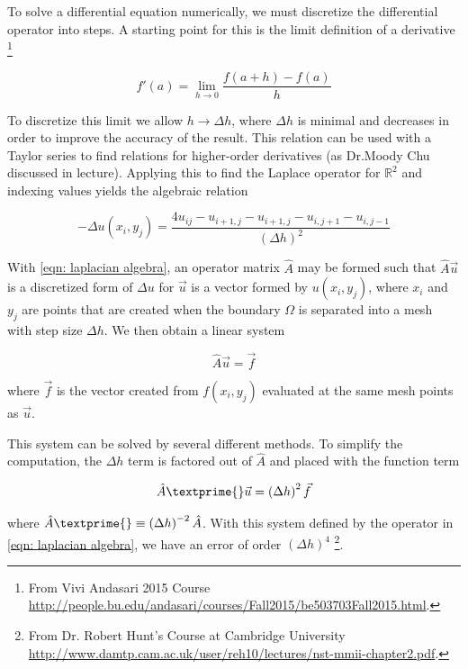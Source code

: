 \documentclass[10pt,a4paper]{article}
\begin{document}
To solve a differential equation numerically, we must discretize the differential operator into steps. A starting point for this is the limit definition of a derivative \footnote{From Vivi Andasari 2015 Course \url{http://people.bu.edu/andasari/courses/Fall2015/be503703Fall2015.html}.}

\begin{equation}
\label{eqn: limit derivative}
f'(a) = \lim\limits_{h \to 0} \frac{f(a + h) - f(a)}{h}
\end{equation}

To discretize this limit we allow $h \to \Delta h$, where $\Delta h$ is minimal and decreases in order to improve the accuracy of the result. This relation can be used with a Taylor series to find relations for higher-order derivatives (as Dr.Moody Chu discussed in lecture). Applying this to find the Laplace operator for $\mathbb{R}^2$ and indexing values yields the algebraic relation

\begin{equation}
\label{eqn: laplacian algebra}
- \Delta u(x_i, y_j) = \frac{4u_{ij} - u_{i+1, j} - u_{i+1, j} - u_{i, j+1} - u_{i, j-1}}{\left( \Delta h \right)^2}
\end{equation}

With \cref{eqn: laplacian algebra}, an operator matrix $\hat{A}$ may be formed such that $\hat{A} \vec{u}$ is a discretized form of $\Delta u$ for $\vec{u}$ is a vector formed by $u(x_i, y_j)$, where $x_i$ and $y_j$ are  points that are created when the boundary $\Omega$ is separated into a mesh with step size $\Delta h$. We then obtain a linear system

\begin{equation}
\label{eqn: linear system}
\hat{A} \vec{u} = \vec{f}
\end{equation}

where $\vec{f}$ is the vector created from $f(x_i, y_j)$ evaluated at the same mesh points as $\vec{u}$. 

This system can be solved by several different methods. To simplify the computation, the $\Delta h$ term is factored out of $\hat{A}$ and placed with the function term

\begin{equation}
\label{eqn: linear system 2}
\hat{A}\textprime{} \vec{u}  = \left( \Delta h \right)^2 \vec{f}
\end{equation}

 where $\hat{A}\textprime{} \equiv \left( \Delta h \right)^{-2} \hat{A}$. With this system defined by the operator in \cref{eqn: laplacian algebra}, we have an error of order $\left( \Delta h \right)^4$  \footnote{From Dr. Robert Hunt's Course at Cambridge University \url{http://www.damtp.cam.ac.uk/user/reh10/lectures/nst-mmii-chapter2.pdf}.}. 
\end{document}
